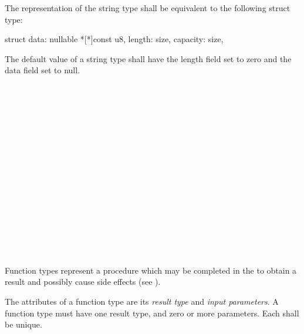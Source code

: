 \specsubsubitem
The representation of the string type shall be equivalent to the following
struct type:

\begin{codesample}
struct {
	data: nullable *[*]const u8,
	length: size,
	capacity: size,
}
\end{codesample}

\specsubsubitem
The default value of a string type shall have the length field set to zero and
the data field set to null.


\begin{grammar}
 \\
	  \\

 \\
	\terminal{(}  \terminal{)}  \\

 \\
	 \optional{\terminal{,}} \\
	  \\
	 \terminal{,}  \\
	 \\

 \\
	 \\
	 \terminal{,}  \\

 \\
	 \terminal{:}  \\
	 \\
\end{grammar}

\specsubsubitem
Function types represent a procedure which may be completed in the
 to obtain a result and possibly cause side
effects (see ).

\specsubsubitem
The attributes of a function type are its \textit{result type} and
\textit{input parameters}. A function type must have one result type, and zero
or more parameters. Each  shall be unique.

